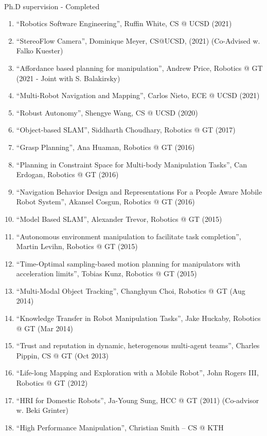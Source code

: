 \documentclass{article}
\begin{document}
\begin{cv}
\begin{cvlist}{~}
\item[Ph.D supervision - Completed]\ \\
  \begin{enumerate}
  \item ``Robotics Software Engineering'', Ruffin White, CS @ UCSD (2021)
  \item ``StereoFlow Camera'', Dominique Meyer, CS@UCSD, (2021)
    (Co-Advised w. Falko Kuester)
  \item ``Affordance based planning for manipulation'', Andrew Price,
    Robotics @ GT (2021 - Joint with S. Balakirsky)
  \item ``Multi-Robot Navigation and Mapping'', Carlos Nieto, ECE @ UCSD (2021)
  \item ``Robust Autonomy'', Shengye Wang, CS @ UCSD (2020)
  \item ``Object-based SLAM'', Siddharth Choudhary, Robotics @ GT (2017)
  \item ``Grasp Planning'', Ana Huaman, Robotics @ GT (2016)
  \item ``Planning in Constraint Space for Multi-body Manipulation
    Tasks'', Can Erdogan, Robotics @ GT (2016)
  \item ``Navigation Behavior Design and Representations For a People
    Aware Mobile Robot System'', Akansel Cosgun, Robotics @ GT (2016)
  \item ``Model Based SLAM'', Alexander Trevor, Robotics @ GT (2015)
  \item ``Autonomous environment manipulation to facilitate task
    completion'', Martin Levihn, Robotics @ GT (2015)
  \item ``Time-Optimal sampling-based motion planning for manipulators
    with acceleration limits'', Tobias Kunz, Robotics @ GT (2015)
  \item ``Multi-Modal Object Tracking'', Changhyun Choi, Robotics @ GT
    (Aug 2014)
  \item ``Knowledge Transfer in Robot Manipulation Tasks'', Jake
    Huckaby, Robotics @ GT (Mar 2014)
  \item ``Trust and reputation in dynamic, heterogenous multi-agent
    teams'', Charles Pippin, CS @ GT (Oct 2013)
  \item ``Life-long Mapping and Exploration with a Mobile Robot'',
    John Rogers III, Robotics @ GT (2012)
  \item ``HRI for Domestic Robots'', Ja-Young Sung, HCC @ GT (2011)
    (Co-advisor w. Beki Grinter)
  \item ``High Performance Manipulation'', Christian Smith -- CS @ KTH

\end{enumerate}
\end{cvlist}
\end{cv}
\end{document}
